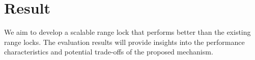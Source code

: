 
\chapter{Result}\label{chapter:result}

We aim to develop a scalable range lock that performs better than the existing range locks. The evaluation results will provide insights into the performance characteristics and potential trade-offs of the proposed mechanism.